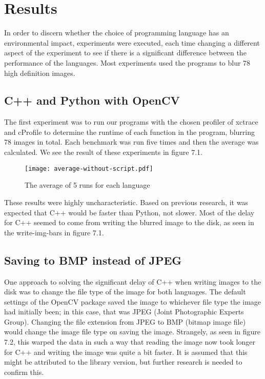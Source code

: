 \chapter{Results}
In order to discern whether the choice of programming language has an environmental impact, experiments were executed, each time changing a different aspect of the experiment to see if there is a significant difference between the performance of the languages. Most experiments used the programs to blur 78 high definition images.

\section{C++ and Python with OpenCV }
The first experiment was to run our programs with the chosen profiler of xctrace and cProfile to determine the runtime of each function in the program, blurring 78 images in total. Each benchmark was run five times and then the average was calculated. We see the result of these experiments in figure 7.1.

\begin{figure}[H]
	\centering
	\texttt{[image: average-without-script.pdf]}
	\caption{The average of 5 runs for each language}
	\label{figure:average-78img}
\end{figure}

These results were highly uncharacteristic. Based on previous research, it was expected that C++ would be faster than Python, not slower. Most of the delay for C++ seemed to come from writing the blurred image to the disk, as seen in the write-img-bars in figure 7.1.

\section{Saving to BMP instead of JPEG}
One approach to solving the significant delay of C++ when writing images to the disk was to change the file type of the image for both languages. The default settings of the OpenCV package saved the image to whichever file type the image had initially been; in this case, that was JPEG (Joint Photographic Experts Group). Changing the file extension from JPEG to BMP (bitmap image file) would change the image file type on saving the image. Strangely, as seen in figure 7.2, this warped the data in such a way that reading the image now took longer for C++ and writing the image was quite a bit faster. It is assumed that this might be attributed to the library version, but further research is needed to confirm this.

